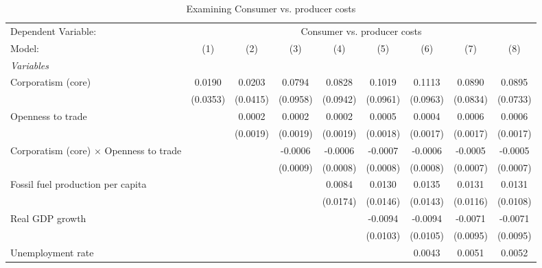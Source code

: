 
\begin{table}[htbp]
   \caption{Examining Consumer vs. producer costs}
   \centering
   \begin{tabular}{lcccccccc}
      \tabularnewline \midrule \midrule
      Dependent Variable: & \multicolumn{8}{c}{Consumer vs. producer costs}\\
      Model:                                         & (1)      & (2)      & (3)      & (4)      & (5)      & (6)      & (7)      & (8)\\  
      \midrule
      \emph{Variables}\\
      Corporatism (core)                             & 0.0190   & 0.0203   & 0.0794   & 0.0828   & 0.1019   & 0.1113   & 0.0890   & 0.0895\\   
                                                     & (0.0353) & (0.0415) & (0.0958) & (0.0942) & (0.0961) & (0.0963) & (0.0834) & (0.0733)\\   
      Openness to trade                              &          & 0.0002   & 0.0002   & 0.0002   & 0.0005   & 0.0004   & 0.0006   & 0.0006\\   
                                                     &          & (0.0019) & (0.0019) & (0.0019) & (0.0018) & (0.0017) & (0.0017) & (0.0017)\\   
      Corporatism (core) $\times$ Openness to trade  &          &          & -0.0006  & -0.0006  & -0.0007  & -0.0006  & -0.0005  & -0.0005\\   
                                                     &          &          & (0.0009) & (0.0008) & (0.0008) & (0.0008) & (0.0007) & (0.0007)\\   
      Fossil fuel production per capita              &          &          &          & 0.0084   & 0.0130   & 0.0135   & 0.0131   & 0.0131\\   
                                                     &          &          &          & (0.0174) & (0.0146) & (0.0143) & (0.0116) & (0.0108)\\   
      Real GDP growth                                &          &          &          &          & -0.0094  & -0.0094  & -0.0071  & -0.0071\\   
                                                     &          &          &          &          & (0.0103) & (0.0105) & (0.0095) & (0.0095)\\   
      Unemployment rate                              &          &          &          &          &          & 0.0043   & 0.0051   & 0.0052\\   

\end{tabular}
\end{table}

